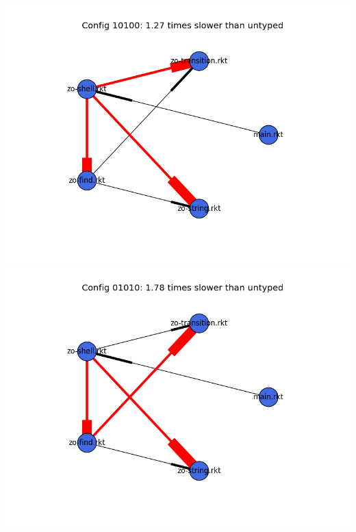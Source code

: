 \documentclass{article}
\begin{document}
\begin{itemize}
\includegraphics[width=\textwidth]{zordoz-module-graph-10100.png}
\includegraphics[width=\textwidth]{zordoz-module-graph-01010.png}
\end{itemize}
\end{document}
